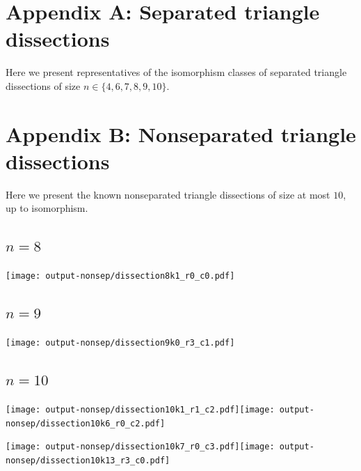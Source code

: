 \documentclass[12pt,amstags,fleqn]{article}
\theoremstyle{plain}
\theoremstyle{definition}
\theoremstyle{definition}
\begin{document}
\clearpage




\clearpage

\section*{Appendix A: Separated triangle dissections}

Here we present representatives of the isomorphism classes of separated triangle
dissections of size $n \in \{4, 6, 7, 8, 9, 10 \}$.



\section*{Appendix B: Nonseparated triangle dissections}

Here we present the known nonseparated triangle dissections of size at
most $10$, up to isomorphism.

\subsection*{$n = 8$}

\begin{center}
\texttt{[image: output-nonsep/dissection8k1\_r0\_c0.pdf]}
\end{center}

\subsection*{$n = 9$}

\begin{center}
\texttt{[image: output-nonsep/dissection9k0\_r3\_c1.pdf]}
\end{center}

\subsection*{$n = 10$}

\begin{center}
\texttt{[image: output-nonsep/dissection10k1\_r1\_c2.pdf]}\texttt{[image: output-nonsep/dissection10k6\_r0\_c2.pdf]}
\end{center}
\begin{center}
\texttt{[image: output-nonsep/dissection10k7\_r0\_c3.pdf]}\texttt{[image: output-nonsep/dissection10k13\_r3\_c0.pdf]}
\end{center}
\end{document}

